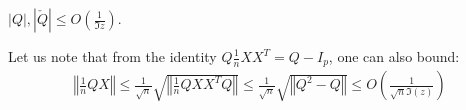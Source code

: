 \documentclass[ECP, preprint]{ejpecp} %
\begin{document}
\begin{lemma}\label{lem:Borne_resolvante}
$|Q|, |\check Q| \leq O \left(\frac{1}{\Im z}\right)$.
\end{lemma}
Let us note that from the identity $Q \frac{1}{n}XX^T = Q - I_p$, one can also bound:
\begin{align}\label{eq:bound_QX}
    \left\Vert\frac{1}{n}Q X\right\Vert \leq \frac{1}{\sqrt n}\sqrt{\left\Vert\frac{1}{n}QXX^TQ\right\Vert} \leq \frac{1}{\sqrt n}\sqrt{\left\Vert Q^ 2 -  Q\right\Vert}\leq O \left( \frac{1}{\sqrt{n}\Im(z)} \right)
\end{align}
\end{document}

